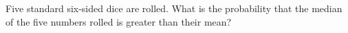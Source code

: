 Five standard six-sided dice are rolled. What is the probability that the median of the five numbers rolled is greater than their mean?
